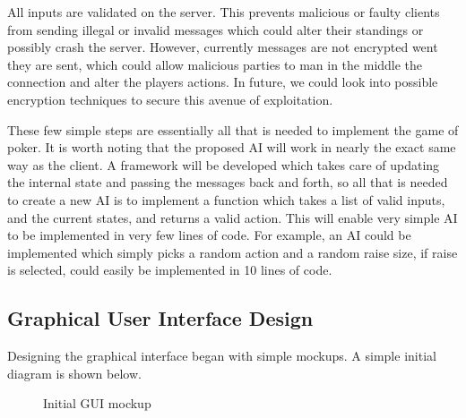 All inputs are validated on the server. This prevents malicious or faulty
clients from sending illegal or invalid messages which could alter their
standings or possibly crash the server. However, currently messages are not
encrypted went they are sent, which could allow malicious parties to man in the
middle the connection and alter the players actions. In future, we could look
into possible encryption techniques to secure this avenue of exploitation.

These few simple steps are essentially all that is needed to implement the
game of poker. It is worth noting that the proposed AI will work in nearly the 
exact same way as the client. A framework will be developed which takes care of 
updating the internal state and passing the messages back and forth, so all 
that is needed to create a new AI is to implement a function which takes a list
of valid inputs, and the current states, and returns a valid action. This will
enable very simple AI to be implemented in very few lines of code. For example,
an AI could be implemented which simply picks a random action and a random 
raise size, if raise is selected, could easily be implemented in 10 lines of
code.

\subsection{Graphical User Interface Design}
Designing the graphical interface began with simple mockups. A simple
initial diagram is shown below.

\begin{figure}[h]
    \caption{Initial GUI mockup}%
    \label{fig:initialgui}
\end{figure}

